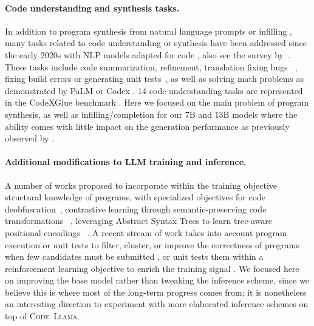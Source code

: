 \paragraph{Code understanding and synthesis tasks.} In addition to program synthesis from natural language prompts or infilling \citep{fried2022incoder,bavarian2022efficient,li2023starcoder,nguyen2023meet}, many tasks related to code understanding or synthesis have been addressed since the early 2020s with NLP models adapted for code \citep{raffel2020exploring,feng2020codebert,guo2020graphcodebert,wang2021codet5,ahmad2021unified}, also see the survey by~\citet{xu2022survey}. These tasks include code summarization, refinement, translation \citep{roziere2020unsupervised,DBLP:journals/corr/abs-2110-06773,szafraniec2022code} fixing bugs ~\citep{yasunaga2021break,zhang2022repairing,prenner2022can}, fixing build errors \citep{tarlow2020learning} or generating unit tests~\citep{tufano2020unit,li2022alphacode,chen2022codet}, as well as solving math problems as demonstrated by PaLM \citep{chowdhery2022palm} or Codex \citep{chen2021evaluating}. 14 code understanding tasks are represented in the CodeXGlue benchmark \citep{CodeXGLUE}. Here we focused on the main problem of program synthesis, as well as infilling/completion for our 7B and 13B models where the ability comes with little impact on the generation performance as previously observed by \citet{bavarian2022efficient}. 

\paragraph{Additional modifications to LLM training and inference.} A number of works proposed to incorporate within the training objective structural knowledge of programs, with specialized objectives for code deobfuscation~\citep{roziere2021dobf}, contrastive learning through semantic-preserving code transformations ~\citep{jain-etal-2021-contrastive}, leveraging Abstract Syntax Trees to learn tree-aware positional encodings ~\citep{NEURIPS2019_6e091746,peng2021integrating}. A recent stream of work takes into account program execution or unit tests to filter, cluster, or improve the correctness of programs when few candidates must be submitted \citep{li2022alphacode,chen2022codet,le2022coderl,zhang2023planning}, or unit tests them within a reinforcement learning objective to enrich the training signal \citep{le2022coderl,liu2023rltf}. We focused here on improving the base model rather than tweaking the inference scheme, since we believe this is where most of the long-term progress comes from; it is nonetheless an interesting direction to experiment with more elaborated inference schemes on top of \textsc{Code~Llama}.

